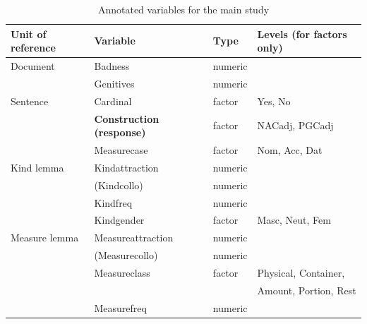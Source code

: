\begin{table}
  \centering
  \begin{tabular}{llll}
    Unit of reference & Variable                      & Type    & Levels (for factors only) \\
    \midrule
    Document       & Badness                          & numeric &                           \\
                   & Genitives                        & numeric &                           \\
    Sentence       & Cardinal                         & factor  & Yes, No                   \\
                   & \textbf{Construction (response)} & factor  & NACadj, PGCadj            \\
                   & Measurecase                      & factor  & Nom, Acc, Dat             \\
    Kind lemma     & Kindattraction                   & numeric &                           \\
                   & (Kindcollo)                      & numeric &                           \\
                   & Kindfreq                         & numeric &                           \\
		   & Kindgender                       & factor  & Masc, Neut, Fem             \\
    Measure lemma  & Measureattraction                & numeric &                           \\
                   & (Measurecollo)                   & numeric &                           \\
                   & Measureclass                     & factor  & Physical, Container,      \\
                   &                                  &         & Amount, Portion, Rest     \\
                   & Measurefreq                      & numeric &                           \\
  \end{tabular}
  \caption{Annotated variables for the main study}
  \label{tab:variables}
\end{table}

